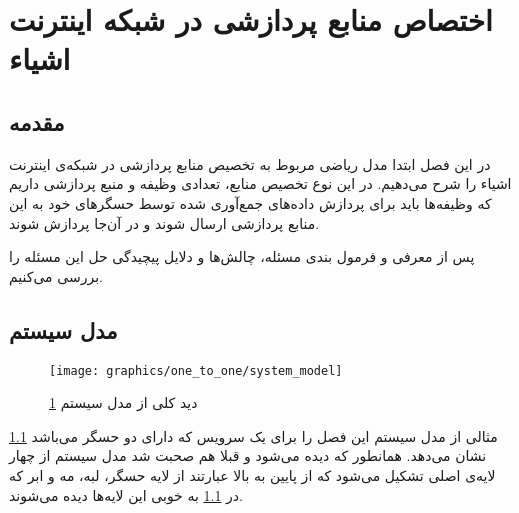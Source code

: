 \chapter{اختصاص منابع پردازشی در شبکه اینترنت اشیاء}\label{chap:system_model_centralized_decentralized}
  \thispagestyle{empty}
  \section{مقدمه}
    در این فصل ابتدا مدل ریاضی مربوط به تخصیص منابع پردازشی در شبکه‌ی اینترنت اشیاء را شرح می‌دهیم. 
    در این نوع تخصیص منابع، تعدادی وظیفه و منبع پردازشی داریم که وظیفه‌ها باید برای پردازش داده‌های جمع‌آوری شده توسط حسگر‌های خود به این منابع پردازشی ارسال شوند و در آن‌جا پردازش شوند.

    پس از معرفی و فرمول بندی مسئله، چالش‌ها و دلایل پیچیدگی حل این مسئله را بررسی می‌کنیم.
  \section{مدل سیستم}
    \begin{figure}[h]
      \centerline{\texttt{[image: graphics/one\_to\_one/system\_model]}}
      \caption{دید کلی از مدل سیستم \cref{chap:system_model_centralized_decentralized}}
      \label{fig:system_model}
    \end{figure}

	    \cref{fig:system_model} مثالی از مدل سیستم این فصل را برای یک سرویس که دارای دو حسگر می‌باشد نشان می‌دهد. همانطور که دیده می‌شود و قبلا هم صحبت شد مدل سیستم از چهار لایه‌ی اصلی تشکیل می‌شود که از پایین به بالا عبارتند از لایه حسگر، لبه، مه و ابر که در \cref{fig:system_model} به خوبی این لایه‌ها دیده می‌شوند. 
    
